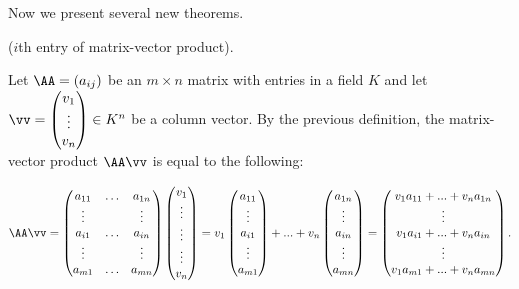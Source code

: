 Now we present several new theorems.

\begin{theorem}
\label{ch::lin_alg::thm::coordinates_of_matrix_vector_product}
    ($i$th entry of matrix-vector product).
    
        Let $\AA = (a_{ij})$ be an $m \times n$ matrix with entries in a field $K$ and let $\vv = \begin{pmatrix} v_1 \\ \vdots \\ v_n \end{pmatrix} \in K^n$ be a column vector. By the previous definition, the matrix-vector product $\AA \vv$ is equal to the following:
    
    \begin{align*}
            \AA \vv = 
            \begin{pmatrix}
                a_{11} & \hdots & a_{1n} \\
                \vdots & & \vdots \\
                a_{i1} & \hdots & a_{in} \\
                \vdots & & \vdots \\
                a_{m1} & \hdots & a_{mn}
            \end{pmatrix}
            \begin{pmatrix} v_1 \\ \vdots \\ \vdots \\ \vdots \\ v_n \end{pmatrix}
            =
            v_1
            \begin{pmatrix} a_{11} \\ \vdots \\ a_{i1} \\ \vdots \\ a_{m1} \end{pmatrix}
            +
            ...
            +
            v_n
            \begin{pmatrix} a_{1n} \\ \vdots \\ a_{in} \\ \vdots \\ a_{mn} \end{pmatrix}
            =
            \begin{pmatrix} v_1 a_{11} + ... + v_n a_{1n} \\ \vdots \\ v_1 a_{i1} + ... + v_n a_{in} \\ \vdots \\ v_1 a_{m1} + ... + v_n a_{mn} \end{pmatrix}.
    \end{align*}


\end{theorem}
